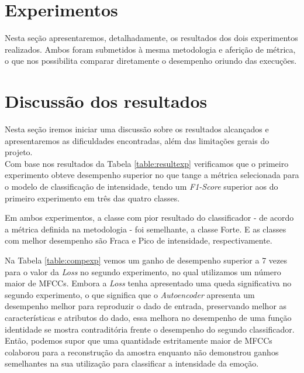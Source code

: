 {{\section{Experimentos}

Nesta seção apresentaremos, detalhadamente, os resultados dos dois experimentos realizados. Ambos foram submetidos à mesma metodologia e aferição de métrica, o que nos possibilita comparar diretamente o desempenho oriundo das execuções.\\




\clearpage

\section{Discussão dos resultados}

Nesta seção iremos iniciar uma discussão sobre os resultados alcançados e apresentaremos as dificuldades encontradas, além das limitações gerais do projeto.\\

Com base nos resultados da Tabela \ref{table:resultexp} verificamos que o primeiro experimento obteve desempenho superior no que tange a métrica selecionada para o modelo de classificação de intensidade, tendo um \textit{F1-Score} superior aos do primeiro experimento em três das quatro classes.

Em ambos experimentos, a classe com pior resultado do classificador - de acordo a métrica definida na metodologia - foi semelhante, a classe Forte. E as classes com melhor desempenho são Fraca e Pico de intensidade, respectivamente.

Na Tabela \ref{table:compexp} vemos um ganho de desempenho superior a 7 vezes para o valor da \textit{Loss} no segundo experimento, no qual utilizamos um número maior de \acrshort{MFCC}s. Embora a \textit{Loss} tenha apresentado uma queda significativa no segundo experimento, o que significa que o \textit{Autoencoder} apresenta um desempenho melhor para reproduzir o dado de entrada, preservando melhor as características e atributos do dado, essa melhora no desempenho de uma função identidade se mostra contraditória frente o desempenho do segundo classificador. Então, podemos supor que uma quantidade estritamente maior de \acrshort{MFCC}s colaborou para a reconstrução da amostra enquanto não demonstrou ganhos semelhantes na sua utilização para classificar a intensidade da emoção.

}}
